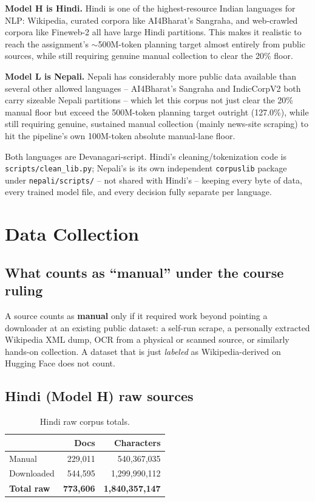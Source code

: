 \documentclass[11pt]{article}
\begin{document}
\textbf{Model H is Hindi.} Hindi is one of the highest-resource Indian
languages for NLP: Wikipedia, curated corpora like AI4Bharat's Sangraha,
and web-crawled corpora like Fineweb-2 all have large Hindi partitions.
This makes it realistic to reach the assignment's $\sim$500M-token
planning target almost entirely from public sources, while still
requiring genuine manual collection to clear the 20\% floor.

\textbf{Model L is Nepali.} Nepali has considerably more public data
available than several other allowed languages -- AI4Bharat's Sangraha
and IndicCorpV2 both carry sizeable Nepali partitions -- which let this
corpus not just clear the 20\% manual floor but exceed the 500M-token
planning target outright (127.0\%), while still requiring genuine,
sustained manual collection (mainly news-site scraping) to hit the
pipeline's own 100M-token absolute manual-lane floor.

Both languages are Devanagari-script. Hindi's cleaning/tokenization code
is \texttt{scripts/clean\_lib.py}; Nepali's is its own independent
\texttt{corpuslib} package under \texttt{nepali/scripts/} -- not shared
with Hindi's -- keeping every byte of data, every trained model file, and
every decision fully separate per language.

\section{Data Collection}

\subsection*{What counts as ``manual'' under the course ruling}

A source counts as \textbf{manual} only if it required work beyond
pointing a downloader at an existing public dataset: a self-run scrape, a
personally extracted Wikipedia XML dump, OCR from a physical or scanned
source, or similarly hands-on collection. A dataset that is just
\textit{labeled} as Wikipedia-derived on Hugging Face does not count.

\subsection{Hindi (Model H) raw sources}

\begin{table}[htbp]
\centering
\begin{tabular}{lrr}
\toprule
& Docs & Characters \\
\midrule
Manual & 229{,}011 & 540{,}367{,}035 \\
Downloaded & 544{,}595 & 1{,}299{,}990{,}112 \\
\textbf{Total raw} & \textbf{773{,}606} & \textbf{1{,}840{,}357{,}147} \\
\bottomrule
\end{tabular}
\caption{Hindi raw corpus totals.}
\end{table}
\end{document}
